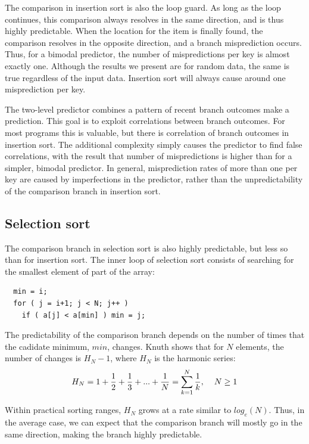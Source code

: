 \documentclass[acmtocl]{acmtrans2m}
\begin{document}
The comparison in insertion sort is also the loop guard.  As long as
the loop continues, this comparison always resolves in the same
direction, and is thus highly predictable. When the location for the
item is finally found, the comparison resolves in the opposite
direction, and a branch misprediction occurs. Thus, for a bimodal
predictor, the number of mispredictions per key is almost exactly
one. Although the results we present are for random data, the same
is true regardless of the input data. Insertion sort will always
cause around one misprediction per key.

The two-level predictor combines a pattern of recent branch outcomes
make a prediction. This goal is to exploit correlations between branch
outcomes. For most programs this is valuable, but there is correlation
of branch outcomes in insertion sort. The additional complexity simply
causes the predictor to find false correlations, with the result that
number of mispredictions is higher than for a simpler, bimodal
predictor. In general, misprediction rates of more than one per key
are caused by imperfections in the predictor, rather than the
unpredictability of the comparison branch in insertion sort.

\subsection{Selection sort}
The comparison branch in selection sort is also highly predictable,
but less so than for insertion sort. The inner loop of selection
sort consists of searching for the smallest element of part of
the array:
\begin{verbatim}
  min = i;
  for ( j = i+1; j < N; j++ )
    if ( a[j] < a[min] ) min = j;
\end{verbatim}
The predictability of the comparison branch depends on the number of
times that the cadidate minimum, $min$, changes. Knuth \cite{Knuth97}
shows that for $N$ elements, the number of changes is $H_N - 1$, where
$H_N$ is the harmonic series:
$$H_N = 1 + \frac{1}{2} + \frac{1}{3} + ... + \frac{1}{N} =  \sum_{k=1}^{N}
\frac{1}{k},  \hspace{0.4cm}  N \geq 1$$

Within practical sorting ranges, $H_N$ grows at a rate similar to
$log_e(N)$. Thus, in the average case, we can expect that the comparison
branch will mostly go in the same direction, making the branch highly
predictable.
\end{document}
